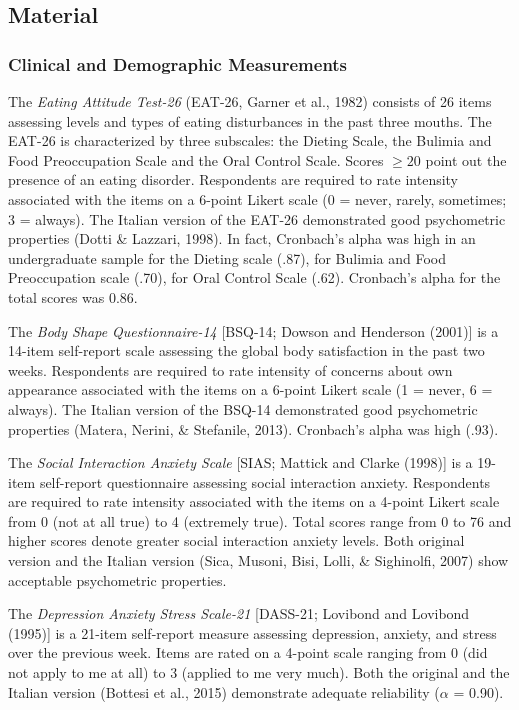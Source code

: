 \documentclass[
  man,floatsintext]{apa6}
\begin{document}
\hypertarget{material}{%
\subsection{Material}\label{material}}

\hypertarget{clinical-and-demographic-measurements}{%
\subsubsection{Clinical and Demographic Measurements}\label{clinical-and-demographic-measurements}}

The \emph{Eating Attitude Test-26} (EAT-26, Garner et al., 1982) consists of 26 items assessing levels and types of eating disturbances in the past three mouths. The EAT-26 is characterized by three subscales: the Dieting Scale, the Bulimia and Food Preoccupation Scale and the Oral Control Scale. Scores \(\ge 20\) point out the presence of an eating disorder. Respondents are required to rate intensity associated with the items on a 6-point Likert scale (0 = never, rarely, sometimes; 3 = always).
The Italian version of the EAT-26 demonstrated good psychometric properties (Dotti \& Lazzari, 1998). In fact, Cronbach's alpha was high in an undergraduate sample for the Dieting scale (.87), for Bulimia and Food Preoccupation scale (.70), for Oral Control Scale (.62).
Cronbach's alpha for the total scores was 0.86.

The \emph{Body Shape Questionnaire-14} {[}BSQ-14; Dowson and Henderson (2001){]} is a 14-item self-report scale assessing the global body satisfaction in the past two weeks. Respondents are required to rate intensity of concerns about own appearance associated with the items on a 6-point Likert scale (1 = never, 6 = always). The Italian version of the BSQ-14 demonstrated good psychometric properties (Matera, Nerini, \& Stefanile, 2013). Cronbach's alpha was high (.93).

The \emph{Social Interaction Anxiety Scale} {[}SIAS; Mattick and Clarke (1998){]} is a 19-item self-report questionnaire assessing social interaction anxiety. Respondents are required to rate intensity associated with the items on a 4-point Likert scale from 0 (not at
all true) to 4 (extremely true). Total scores range from 0 to 76 and higher scores denote greater social interaction anxiety levels. Both original version and the Italian version (Sica, Musoni, Bisi, Lolli, \& Sighinolfi, 2007) show acceptable psychometric properties.

The \emph{Depression Anxiety Stress Scale-21} {[}DASS-21; Lovibond and Lovibond (1995){]} is a 21-item self-report measure assessing depression, anxiety, and stress over the previous week. Items are rated on a 4-point scale ranging from 0 (did not apply to me at all) to 3 (applied to me very much). Both the original and the Italian version (Bottesi et al., 2015) demonstrate adequate reliability (\(\alpha\) = 0.90).
\end{document}

